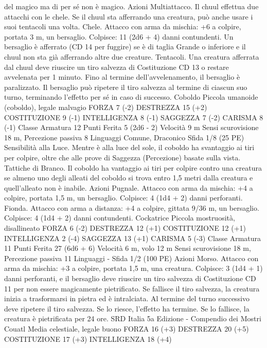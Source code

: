 \begin{multicols}{2}
del magico ma di per sé non è magico.
Azioni
Multiattacco. Il chuul effettua due attacchi con le chele. Se il
chuul sta afferrando una creatura, può anche usare i suoi
tentacoli una volta.
Chele. Attacco con arma da mischia: +6 a colpire, portata 3 m,
un bersaglio.
Colpisce: 11 (2d6 + 4) danni contundenti. Un bersaglio è
afferrato (CD 14 per fuggire) se è di taglia Grande o inferiore e il
chuul non sta già afferrando altre due creature.
Tentacoli. Una creatura afferrata dal chuul deve riuscire un tiro
salvezza di Costituzione CD 13 o restare avvelenata per 1
minuto. Fino al termine dell’avvelenamento, il bersaglio è
paralizzato. Il bersaglio può ripetere il tiro salvezza al termine di
ciascun suo turno, terminando l’effetto per sé in caso di successo.
Coboldo
Piccola umanoide (coboldo), legale malvagio
FORZA 7 (-2)
DESTREZZA 15 (+2)
COSTITUZIONE 9 (-1)
INTELLIGENZA 8 (-1)
SAGGEZZA 7 (-2)
CARISMA 8 (-1)
Classe Armatura 12
Punti Ferita 5 (2d6 - 2)
Velocità 9 m
Sensi scurovisione 18 m, Percezione passiva 8
Linguaggi Comune, Draconico
Sfida 1/8 (25 PE)
Sensibilità alla Luce. Mentre è alla luce del sole, il coboldo ha
svantaggio ai tiri per colpire, oltre che alle prove di Saggezza
(Percezione) basate sulla vista.
Tattiche di Branco. Il coboldo ha vantaggio ai tiri per colpire
contro una creatura se almeno uno degli alleati del coboldo si
trova entro 1,5 metri dalla creatura e quell’alleato non è inabile.
Azioni
Pugnale. Attacco con arma da mischia: +4 a colpire, portata 1,5
m, un bersaglio.
Colpisce: 4 (1d4 + 2) danni perforanti.
Fionda. Attacco con arma a distanza: +4 a colpire, gittata 9/36
m, un bersaglio.
Colpisce: 4 (1d4 + 2) danni contundenti.
Cockatrice
Piccola mostruosità, disallineato
FORZA 6 (-2)
DESTREZZA 12 (+1)
COSTITUZIONE 12 (+1)
INTELLIGENZA 2 (-4)
SAGGEZZA 13 (+1)
CARISMA 5 (-3)
Classe Armatura 11
Punti Ferita 27 (6d6 + 6)
Velocità 6 m, volo 12 m
Sensi scurovisione 18 m, Percezione passiva 11
Linguaggi -
Sfida 1/2 (100 PE)
Azioni
Morso. Attacco con arma da mischia: +3 a colpire, portata 1,5
m, una creatura.
Colpisce: 3 (1d4 + 1) danni perforanti, e il bersaglio deve
riuscire un tiro salvezza di Costituzione CD 11 per non essere
magicamente pietrificato. Se fallisce il tiro salvezza, la creatura
inizia a trasformarsi in pietra ed è intralciata. Al termine del
turno successivo deve ripetere il tiro salvezza. Se lo riesce,
l’effetto ha termine. Se lo fallisce, la creatura è pietrificata per 24
ore.
SRD Italia 5a Edizione - Compendio dei Mostri
Couatl
Media celestiale, legale buono
FORZA 16 (+3)
DESTREZZA 20 (+5)
COSTITUZIONE 17 (+3)
INTELLIGENZA 18 (+4)

\end{multicols}
